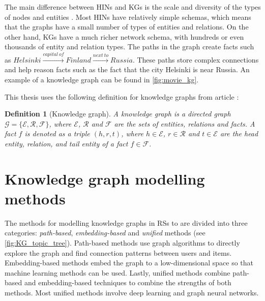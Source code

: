 \documentclass[english, 12pt, a4paper, sci, utf8, a-2b, online]{aaltothesis}
\newtheorem{definition}{Definition}[section]
\begin{document}


The main difference between HINs and KGs is the scale and diversity of the types of nodes and entities \parencite{sun2022heterogeneous}. Most HINs have relatively simple schemas, which means that the graphs have a small number of types of entities and relations. On the other hand, KGs have a much richer network schema, with hundreds or even thousands of entity and relation types. The paths in the graph create facts such as $Helsinki \xrightarrow{capital\ of}Finland \xrightarrow{next\ to}Russia$. These paths store complex connections and help reason facts such as the fact that the city Helsinki is near Russia. An example of a knowledge graph can be found in \autoref{fig:movie_kg}.

This thesis uses the following definition for knowledge graphs from article \parencite{Ji_2022}: 

\begin{definition}[Knowledge graph]
\label{def:KG_formal}
A knowledge graph is a directed graph $\mathcal{G = \{\mathcal{E}, \mathcal{R}, \mathcal{F}\}}$, where $\mathcal{E}$, $\mathcal{R}$ and $\mathcal{F}$ are the sets of entities, relations and facts. A fact $f$ is denoted as a triple $(h,r,t)$, where $h \in \mathcal{E}$, $r \in \mathcal{R}$ and $t\in \mathcal{E}$ are the head entity, relation, and tail entity of a fact $f \in\mathcal{F}$.
\end{definition}



\newpage

\section{Knowledge graph modelling methods}
\label{sec:knowledge_graph_modelling}


The methods for modelling knowledge graphs in RSs to are divided into three categories: \textit{path-based}, \textit{embedding-based} and \textit{unified} methods (see \autoref{fig:KG_topic_tree}). Path-based methods use graph algorithms to directly explore the graph and find connection patterns between users and items. Embedding-based methods embed the graph to a low-dimensional space so that machine learning methods can be used. Lastly, unified methods combine path-based and embedding-based techniques to combine the strengths of both methods. Most unified methods involve deep learning and graph neural networks.
\end{document}
